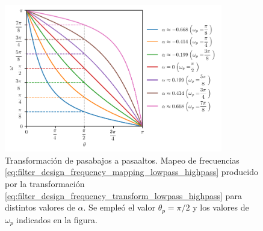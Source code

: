 \documentclass[a4paper]{report}
\begin{document}
\begin{figure}[!htb]
 \begin{center}
 \includegraphics[width=0.85\textwidth]{figuras/filter_design_frequency_transformations_low_high_mapping.pdf}
 \caption{\label{fig:filter_design_frequency_transformations_low_high_mapping} Transformación de pasabajos a pasaaltos. Mapeo de frecuencias \ref{eq:filter_design_frequency_mapping_lowpass_highpass} producido por la transformación \ref{eq:filter_design_frequency_transform_lowpass_highpass} para distintos valores de \(\alpha\). Se  empleó el valor \(\theta_p=\pi/2\) y los valores de \(\omega_p\) indicados en la figura.}
 \end{center}
\end{figure}
\end{document}

